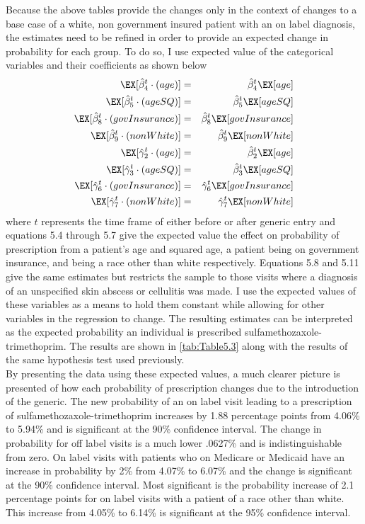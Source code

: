
\newpage
Because the above tables provide the changes only in the context of changes to a base case of a white, non government insured patient with an on label diagnosis, the estimates need to be refined in order to provide an expected change in probability for each group. To do so, I use expected value of the categorical variables and their coefficients as shown below
\begin{eqnarray}
    \EX[\hat{\beta}_4^t\cdot(age)] &=& \hat{\beta}_4^t\EX[age]\\
    \EX[\hat{\beta}_5^t\cdot(ageSQ)] &=& \hat{\beta}_5^t\EX[ageSQ]\\
    \EX[\hat{\beta}_8^t\cdot(govInsurance)] &=& \hat{\beta}_8^t\EX[govInsurance]\\
    \EX[\hat{\beta}_9^t\cdot(nonWhite)] &=& \hat{\beta}_9^t\EX[nonWhite]\\
    \EX[\hat{\gamma}_2^t\cdot(age)] &=& \hat{\beta}_2^t\EX[age]\\
    \EX[\hat{\gamma}_3^t\cdot(ageSQ)] &=& \hat{\beta}_3^t\EX[ageSQ]\\
    \EX[\hat{\gamma}_6^t\cdot(govInsurance)] &=& \hat{\gamma}_6^t\EX[govInsurance]\\
    \EX[\hat{\gamma}_7^t\cdot(nonWhite)] &=& \hat{\gamma}_7^t\EX[nonWhite]
\end{eqnarray}
where $t$ represents the time frame of either before or after generic entry and equations 5.4 through 5.7 give the expected value the effect on probability of prescription from a patient's age and squared age, a patient being on government insurance, and being a race other than white respectively. Equations 5.8 and 5.11 give the same estimates but restricts the sample to those visits where a diagnosis of an unspecified skin abscess or cellulitis was made. I use the expected values of these variables as a means to hold them constant while allowing for other variables in the regression to change. The resulting estimates can be interpreted as the expected probability an individual is prescribed sulfamethozaxole-trimethoprim. The results are shown in \autoref{tab:Table5.3} along with the results of the same hypothesis test used previously.\\
\indent By presenting the data using these expected values, a much clearer picture is presented of how each probability of prescription changes due to the introduction of the generic. The new probability of an on label visit leading to a prescription of sulfamethozaxole-trimethoprim increases by 1.88 percentage points from 4.06\% to 5.94\% and is significant at the 90\% confidence interval. The change in probability for off label visits is a much lower .0627\% and is indistinguishable from zero. On label visits with patients who on Medicare or Medicaid have an increase in probability by 2\% from 4.07\% to 6.07\% and the change is significant at the 90\% confidence interval. Most significant is the probability increase of 2.1 percentage points for on label visits with a patient of a race other than white. This increase from 4.05\% to 6.14\% is significant at the 95\% confidence interval.\\
